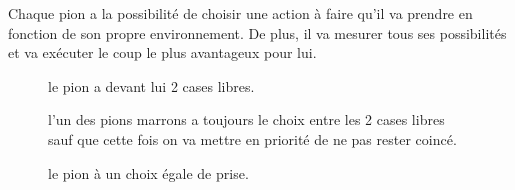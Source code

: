 \documentclass[11pt]{article} %
\begin{document}
Chaque pion a la possibilité de choisir une action à faire qu’il va prendre en fonction de son propre environnement. De plus, il va mesurer tous ses possibilités et va exécuter le coup le plus avantageux pour lui. 

\begin{figure}
\caption{le pion a devant lui 2 cases libres.}
\label{fig_sim}
\centering
{}
\end{figure}

\begin{figure}
\caption{ l’un des pions marrons a toujours le choix entre les 2 cases libres sauf que cette fois on va mettre en priorité de ne pas rester coincé.}
\label{fig_sim}
\centering
{}
\end{figure}

\begin{figure}
\caption{le pion à un choix égale de prise.}
\label{fig_sim}
\centering
{}
\end{figure}
\end{document}

